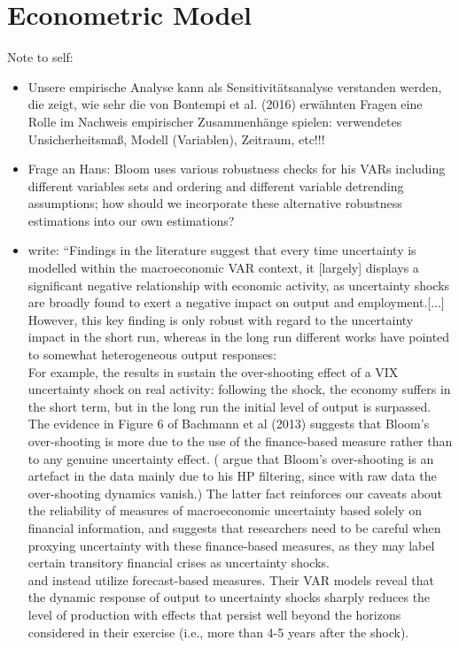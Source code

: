 \documentclass[a4paper,11pt,listof=nochaptergap,oneside,pointednumbers,bibtotoc,bigheadings,liststotoc]{scrbook}
\theoremstyle{mysatz}
\theoremstyle{mydefinition}
\theoremstyle{mybemerkung}
\begin{document}
\chapter{Econometric Model}
\label{sec:EconometricModel}
\begingroup
    \fontsize{8pt}{12pt}\selectfont
    Note to self:
\begin{itemize}
	\item Unsere empirische Analyse kann als Sensitivitätsanalyse verstanden werden, die zeigt, wie sehr die von Bontempi et al. (2016) erwähnten Fragen eine Rolle im Nachweis empirischer Zusammenhänge spielen: verwendetes Unsicherheitsmaß, Modell (Variablen), Zeitraum, etc!!!
	\item Frage an Hans: Bloom uses various robustness checks for his VARs including different variables sets and ordering and different variable detrending assumptions; how should we incorporate these alternative robustness estimations into our own estimations?
	\item \citet{bontempietal:16} write: ``Findings in the literature suggest that every time uncertainty is modelled within the macroeconomic VAR context, it [largely] displays a significant negative relationship with economic activity, as uncertainty shocks are broadly found to exert a negative impact on output and employment.[...] \\
	However, this key finding is only robust with regard to the uncertainty impact in the short run, whereas in the long run different works have pointed to somewhat heterogeneous output responses:\\
	For example, the results in \citet{bloom:09} sustain the over-shooting effect of a VIX uncertainty shock on real activity: following the shock, the economy suffers in the short term, but in the long run the initial level of output is surpassed. The evidence in Figure 6 of Bachmann et al (2013) suggests that Bloom's over-shooting is more due to the use of the finance-based measure rather than to any genuine uncertainty effect. (\citet{juradoetal:15} argue that Bloom's over-shooting is an artefact in the data mainly due to his HP filtering, since with raw data the over-shooting dynamics vanish.) The latter fact reinforces our caveats about the reliability of measures of macroeconomic uncertainty based solely on financial information, and suggests that researchers need to be careful when proxying uncertainty with these finance-based measures, as they may label certain transitory financial crises as uncertainty shocks.\\
	\citet{juradoetal:15} and \citet{bachmannetal:13} instead utilize forecast-based measures. Their VAR models reveal that the dynamic response of output to uncertainty shocks sharply reduces the level of production with effects that persist well beyond the horizons considered in their exercise (i.e., more than 4-5 years after the shock).\\

\end{itemize}
\end{document}

